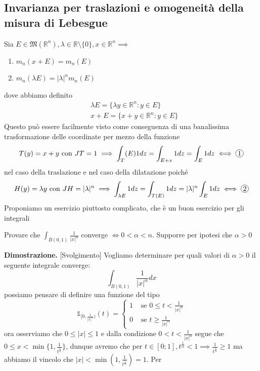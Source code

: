 \subsection{Invarianza per traslazioni e omogeneità della misura di Lebesgue}
Sia $E \in \mathfrak{M}(\mathbb{R}^n), \lambda \in \mathbb{R} \setminus \{0\}, x \in \mathbb{R}^n \implies$
\begin{enumerate}[label=\protect\circled{\arabic*}]
	\item $m_n(x+E) = m_n(E)$
	\item $m_n(\lambda E) = |\lambda|^n m_n(E)$
\end{enumerate}
dove abbiamo definito
\[\begin{aligned}
&\lambda E = \{\lambda y \in \mathbb{R}^n : y \in E \} \\
&x + E = \{x+y \in \mathbb{R}^n : y \in E \}
\end{aligned}\]
Questo può essere facilmente visto come conseguenza di una banalissima trasformazione delle coordinate per mezzo della funzione
$$
T(y) = x + y \text{ con } JT = 1 \implies \int_T(E) 1dz = \int_{E+x} 1dz = \int_E 1dz \iff \circled{1}
$$
nel caso della traslazione e nel caso della dilatazione poiché
$$
H(y) = \lambda y \text{ con } JH = |\lambda|^n \implies \int_{\lambda E} 1dz = \int_{T(E)} 1dz = |\lambda|^n \int_E 1dz \iff \circled{2}
$$
Proponiamo un esercizio piuttosto complicato, che è un buon esercizio per gli integrali
%
\vspace{0.5cm}
\begin{exercise}
Provare che $\int_{B(0, 1)} \frac{1}{|x|^\alpha}$ converge $\iff 0 < \alpha < n$. Supporre per ipotesi che $\alpha > 0$
\end{exercise}
%
\noindent \textbf{Dimostrazione. }[Svolgimento]
	Vogliamo determinare per quali valori di $\alpha > 0$ il seguente integrale converge:
	$$
	\int_{B(0, 1)} \frac{1}{|x|^\alpha} dx
	$$
	possiamo pensare di definire una funzione del tipo
	$$
	\mathbb{1}_{[0, \frac{1}{|x|^\alpha})}(t) = \begin{cases} 1 & \text{ se } 0 \leq t < \frac{1}{|x|^\alpha} \\
	0 & \text{ se } t \geq \frac{1}{|x|^\alpha}
	\end{cases}
	$$
	ora osserviamo che $0 \leq |x| \leq 1$ e dalla condizione $0 < t < \frac{1}{|x|^\alpha}$ segue che $0 \leq x < \min\{1, \frac{1}{t^{\frac{1}{\alpha}}} \}$, dunque avremo che per $t \in [0; 1], t^{\frac{1}{\alpha}} < 1 \implies \frac{1}{t^{\frac{1}{\alpha}}} \geq 1$ ma abbiamo il vincolo che $|x| < \min{(1, \frac{1}{t^{\frac{1}{\alpha}}})} = 1$. Per
